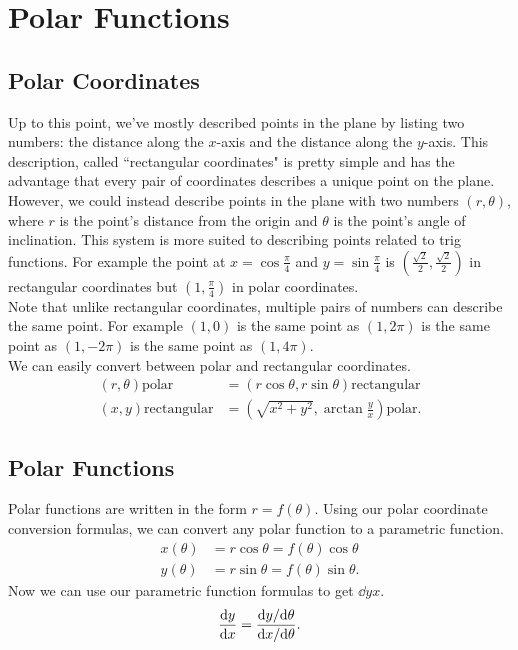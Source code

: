 \section{Polar Functions}
\subsection{Polar Coordinates}
Up to this point, we've mostly described points in the plane by listing two numbers: the distance along the $x$-axis and the distance along the $y$-axis.
This description, called ``rectangular coordinates" is pretty simple and has the advantage that every pair of coordinates describes a unique point on the plane. \\

\noindent
However, we could instead describe points in the plane with two numbers $(r,\theta)$, where $r$ is the point's distance from the origin and $\theta$ is the point's angle of inclination.
This system is more suited to describing points related to trig functions.
For example the point at $x=\cos{\frac{\pi}{4}}$ and $y=\sin{\frac{\pi}{4}}$ is $\left(\frac{\sqrt{2}}{2},\frac{\sqrt{2}}{2}\right)$ in rectangular coordinates but $\left(1,\frac{\pi}{4}\right)$ in polar coordinates. \\

\noindent
Note that unlike rectangular coordinates, multiple pairs of numbers can describe the same point.
For example $\left(1,0\right)$ is the same point as $\left(1,2\pi\right)$ is the same point as $\left(1,-2\pi\right)$ is the same point as $\left(1,4\pi\right)$. \\

\noindent
We can easily convert between polar and rectangular coordinates.
\begin{align*}
	\left(r,\theta\right) \text{polar} &= \left(r\cos{\theta}, r\sin{\theta}\right) \text{rectangular} \\
	\left(x,y\right) \text{rectangular} &= \left(\sqrt{x^2+y^2}, \arctan{\frac{y}{x}}\right) \text{polar}.
\end{align*}

\subsection{Polar Functions}
Polar functions are written in the form $r = f(\theta)$.
Using our polar coordinate conversion formulas, we can convert any polar function to a parametric function.
\begin{align*}
	x(\theta) &= r\cos{\theta} = f(\theta)\cos{\theta} \\
	y(\theta) &= r\sin{\theta} = f(\theta)\sin{\theta}.
\end{align*}
\noindent
Now we can use our parametric function formulas to get $\dd{y}{x}$.
\begin{equation*}
	\frac{\mathrm{d} y}{\mathrm{d} x} = \frac{\mathrm{d} y/\mathrm{d} \theta}{\mathrm{d} x/\mathrm{d} \theta}.
\end{equation*}

